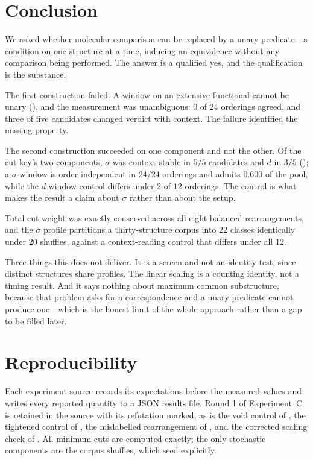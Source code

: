 \documentclass[11pt,twocolumn,a4paper]{article}
\theoremstyle{upthm}
\theoremstyle{definition}
\theoremstyle{remark}
\newcommand{\sep}{\sigma}
\newcommand{\dep}{d}
\begin{document}
\section{Conclusion}
\label{sec:conclusion}

We asked whether molecular comparison can be replaced by a unary
predicate---a condition on one structure at a time, inducing an
equivalence without any comparison being performed. The answer is a
qualified yes, and the qualification is the substance.

The first construction failed. A window on an extensive functional cannot
be unary (), and the measurement was
unambiguous: $0$ of $24$ orderings agreed, and three of five candidates
changed verdict with context. The failure identified the missing
property.

The second construction succeeded on one component and not the other. Of
the cut key's two components, $\sep$ was context-stable in $5/5$
candidates and $\dep$ in $3/5$ (); a $\sep$-window
is order independent in $24/24$ orderings and admits $0.600$ of the pool,
while the $\dep$-window control differs under $2$ of $12$ orderings. The
control is what makes the result a claim about $\sep$ rather than about
the setup.

Total cut weight was exactly conserved across all eight balanced
rearrangements, and the $\sep$ profile partitions a thirty-structure
corpus into $22$ classes identically under $20$ shuffles, against a
context-reading control that differs under all $12$.

Three things this does not deliver. It is a screen and not an identity
test, since distinct structures share profiles. The linear scaling is a
counting identity, not a timing result. And it says nothing about maximum
common substructure, because that problem asks for a correspondence and a
unary predicate cannot produce one---which is the honest limit of the
whole approach rather than a gap to be filled later.

\section*{Reproducibility}

Each experiment source records its expectations before the measured
values and writes every reported quantity to a JSON results file. Round 1
of Experiment~C is retained in the source with its refutation marked, as
is the void control of , the tightened control of
, the mislabelled rearrangement of
, and the corrected scaling check of
. All minimum cuts are computed exactly; the only
stochastic components are the corpus shuffles, which seed explicitly.



\end{document}
